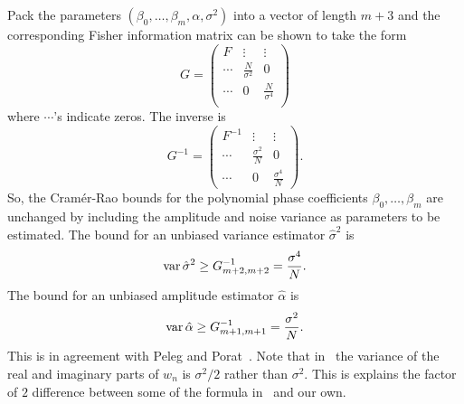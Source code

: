 \documentclass[journal,10pt]{IEEEtran}
\begin{document}
Pack the parameters $(\beta_0, \dots, \beta_m,\alpha,\sigma^2)$ into a vector of length $m+3$ and the corresponding Fisher information matrix can be shown to take the form
\[
G = \left( \begin{array}{ccc}
F & \vdots & \vdots \\
\cdots & \frac{N}{\sigma^2} & 0\\
\cdots & 0 & \frac{N}{\sigma^4} \\
\end{array}\right)
\]
where $\cdots$'s indicate zeros.  The inverse is
\[
G^{-1} = \left( \begin{array}{ccc}
F^{-1} & \vdots & \vdots \\
\cdots & \frac{\sigma^2}{N} & 0 \\
\cdots & 0 & \frac{\sigma^4}{N}
\end{array} \right).
\]
So, the Cram\'{e}r-Rao bounds for the polynomial phase coefficients $\beta_0, \dots, \beta_m$ are unchanged by including the amplitude and noise variance as parameters to be estimated.  The bound for an unbiased variance estimator $\hat{\sigma}^2$ is
\[
\operatorname{var} \hat{\sigma}^2 \geq G_{m+2,m+2}^{-1} = \frac{\sigma^4}{N}.
\]
The bound for an unbiased amplitude estimator $\hat{\alpha}$ is
\[
\operatorname{var} \hat{\alpha} \geq G_{m+1,m+1}^{-1} = \frac{\sigma^2}{N}.
\]
This is in agreement with Peleg and Porat~\cite{Peleg1991_CRB_PPS_1991}.  Note that in~\cite{Peleg1991_CRB_PPS_1991} the variance of the real and imaginary parts of $w_n$ is $\sigma^2/2$ rather than $\sigma^2$.  This is explains the factor of $2$ difference between some of the formula in~\cite{Peleg1991_CRB_PPS_1991} and our own.

\end{document}
